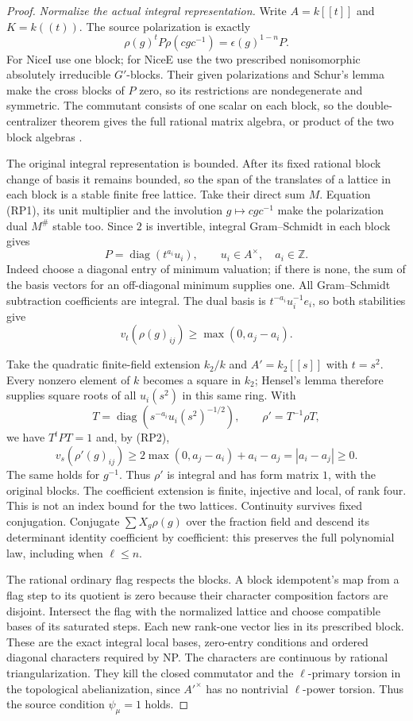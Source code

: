 \begin{proof}
\emph{Normalize the actual integral representation.}
Write $A=k[[t]]$ and $K=k((t))$.  The source polarization is exactly
\[
 \rho(g)^tP\rho(cgc^{-1})=\epsilon(g)^{1-n}P.               \tag{RP1}
\]
For NiceI use one block; for NiceE use the two prescribed nonisomorphic
absolutely irreducible $G'$-blocks.  Their given polarizations and
Schur's lemma make the cross blocks of $P$ zero, so its restrictions
are nondegenerate and symmetric.  The commutant consists of one scalar
on each block, so the double-centralizer theorem gives the full rational
matrix algebra, or product of the two block algebras
\cite[IV.1.14--1.16]{SelmerArPropCFT}.

The original integral representation is bounded.  After its fixed
rational block change of basis it remains bounded, so the span of the
translates of a lattice in each block is a stable finite free lattice.
Take their direct sum $M$.  Equation (RP1), its unit multiplier and
the involution $g\mapsto cgc^{-1}$ make the polarization dual $M^\#$
stable too.  Since $2$ is invertible, integral Gram--Schmidt in each
block gives
\[
 P=\operatorname{diag}(t^{a_i}u_i),\qquad
 u_i\in A^\times,\quad a_i\in\mathbb Z.
\]
Indeed choose a diagonal entry of minimum valuation; if there is none,
the sum of the basis vectors for an off-diagonal minimum supplies one.
All Gram--Schmidt subtraction coefficients are integral.  The dual
basis is $t^{-a_i}u_i^{-1}e_i$, so both stabilities give
\[
 v_t(\rho(g)_{ij})\ge\max(0,a_j-a_i).                      \tag{RP2}
\]

Take the quadratic finite-field extension $k_2/k$ and $A'=k_2[[s]]$
with $t=s^2$.  Every nonzero element of $k$ becomes a square in $k_2$;
Hensel's lemma therefore supplies square roots of all $u_i(s^2)$ in
this same ring.  With
\[
 T=\operatorname{diag}(s^{-a_i}u_i(s^2)^{-1/2}),\qquad
 \rho'=T^{-1}\rho T,
\]
we have $T^tPT=1$ and, by (RP2),
\[
 v_s(\rho'(g)_{ij})\ge
 2\max(0,a_j-a_i)+a_i-a_j=|a_i-a_j|\ge0.                  \tag{RP3}
\]
The same holds for $g^{-1}$.  Thus $\rho'$ is integral and has form
matrix $1$, with the original blocks.  The coefficient extension is
finite, injective and local, of rank four.  This is not an index bound
for the two lattices.  Continuity survives fixed conjugation.  Conjugate
$\sum X_g\rho(g)$ over the fraction field and descend its determinant
identity coefficient by coefficient: this preserves the full polynomial
law, including when $\ell\le n$.

The rational ordinary flag respects the blocks.  A block idempotent's
map from a flag step to its quotient is zero because their character
composition factors are disjoint.  Intersect the flag with the normalized
lattice and choose compatible bases of its saturated steps.  Each new
rank-one vector lies in its prescribed block.  These are the exact
integral local bases, zero-entry conditions and ordered diagonal
characters required by NP.  The characters are continuous by rational
triangularization.  They kill the closed commutator and the
$\ell$-primary torsion in the topological abelianization, since $A'^\times$
has no nontrivial $\ell$-power torsion.  Thus the source condition
$\psi_\mu=1$ holds.


\end{proof}
